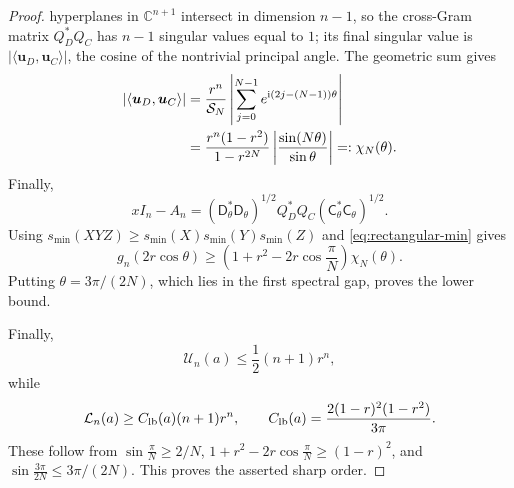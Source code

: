 \documentclass[a4paper,preprint,12pt,nopreprintline,sort&compress]{elsarticle}
\numberwithin{equation}{section}
\theoremstyle{remark}
\newcommand{\C}{\mathbb C}
\newcommand{\ii}{\mathrm i}
\begin{document}
\begin{proof}
hyperplanes in \(\C^{n+1}\) intersect in dimension \(n-1\), so
the cross-Gram matrix \(Q_D^*Q_C\) has \(n-1\) singular values equal to
\(1\); its final singular value is
\(|\langle\boldsymbol u_D,\boldsymbol u_C\rangle|\), the cosine of the
nontrivial principal angle.  The
geometric sum gives
\begin{align}
 |\langle\boldsymbol u_D,\boldsymbol u_C\rangle|
 &=\frac{r^n}{\mathcal S_N}
 \left|\sum_{j=0}^{N-1}e^{\ii(2j-(N-1))\theta}\right|\notag\\
 &=
 \frac{r^n(1-r^2)}{1-r^{2N}}
 \left|\frac{\sin(N\theta)}{\sin\theta}\right|
 =:\chi_N(\theta).
\label{eq:chi}
\end{align}
Finally,
\[
 xI_n-A_n=(\mathsf{D}_\theta^*\mathsf{D}_\theta)^{1/2}
 Q_D^*Q_C(\mathsf{C}_\theta^*\mathsf{C}_\theta)^{1/2}.
\]
Using \(s_{\min}(XYZ)\geq
s_{\min}(X)s_{\min}(Y)s_{\min}(Z)\) and
\eqref{eq:rectangular-min} gives
\[
 g_n(2r\cos\theta)\geq
 \left(1+r^2-2r\cos\frac{\pi}{N}\right)\chi_N(\theta).
\]
Putting \(\theta=3\pi/(2N)\), which lies in the first spectral gap,
proves the lower bound.

Finally,
\[
 \mathcal U_n(a)\leq\frac12(n+1)r^n,
\]
while
\begin{equation}\label{eq:L-simple}
 \mathcal L_n(a)\geq C_{\rm lb}(a)(n+1)r^n,\qquad
 C_{\rm lb}(a)=\frac{2(1-r)^2(1-r^2)}{3\pi}.
\end{equation}
These follow from
\(\sin\frac{\pi}{N}\geq2/N\),
\(1+r^2-2r\cos\frac{\pi}{N}\geq(1-r)^2\), and
\(\sin\frac{3\pi}{2N}\leq3\pi/(2N)\).  This proves the asserted sharp
order.
\end{proof}
\end{document}
